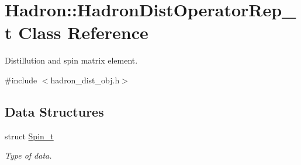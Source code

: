 \hypertarget{classHadron_1_1HadronDistOperatorRep__t}{}\section{Hadron\+:\+:Hadron\+Dist\+Operator\+Rep\+\_\+t Class Reference}
\label{classHadron_1_1HadronDistOperatorRep__t}


Distillution and spin matrix element.  




{\ttfamily \#include $<$hadron\+\_\+dist\+\_\+obj.\+h$>$}

\subsection*{Data Structures}
\begin{DoxyCompactItemize}
\item 
struct \mbox{\hyperlink{structHadron_1_1HadronDistOperatorRep__t_1_1Spin__t}{Spin\+\_\+t}}
\begin{DoxyCompactList}\small\item\em Type of data. \end{DoxyCompactList}\end{DoxyCompactItemize}
